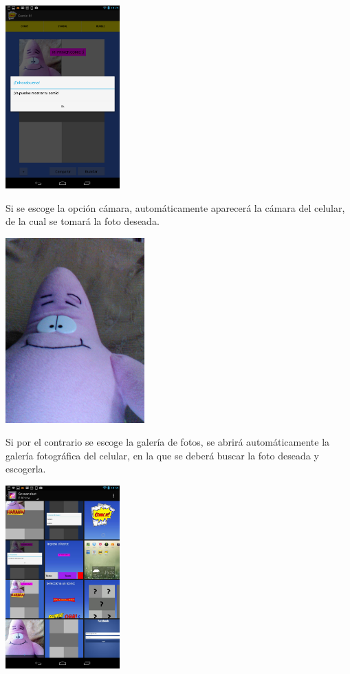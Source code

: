 \documentclass[12pt]{report}
\begin{document}
	\begin{center}
		\begingroup
			\includegraphics[width=0.33\textwidth]{imagenes_usuario/camara.png}
		\endgroup
	\end{center}

Si se escoge la opción cámara, automáticamente aparecerá la cámara del celular, de la cual se tomará la foto deseada.
\newline
	\begin{center}
		\begingroup
			\includegraphics[width=0.40\textwidth]{imagenes_usuario/foto.jpg}
		\endgroup
	\end{center}



Si por el contrario se escoge la galería de fotos, se abrirá automáticamente la galería fotográfica del celular, en la que se deberá buscar la foto deseada y escogerla.
\newline
	\begin{center}
		\begingroup
			\includegraphics[width=0.33\textwidth]{imagenes_usuario/galeria.png}
		\endgroup
	\end{center}
\end{document}
